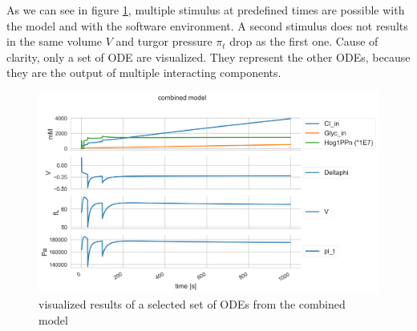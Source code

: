As we can see in figure \ref{SingleDose}, multiple stimulus at predefined times are possible with the model and with the software environment. A second stimulus does not results in the same volume $V$ and turgor pressure $\pi_t$ drop as the first one. Cause of clarity, only a set of ODE are visualized. They represent the other ODEs, because they are the output of multiple interacting components. 
\begin{figure}[h!]
	\begin{center}
		\begin{minipage}{0,8\textwidth}
			
			\includegraphics[width=\textwidth]{picture/combined_models_71.png}
			\caption{visualized results of a selected set of ODEs from the combined model} 
			\label{SingleDose} 
		\end{minipage}
	\end{center}
\end{figure}

